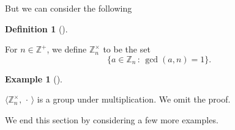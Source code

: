 \documentclass[10pt,]{book}
\theoremstyle{plain}
\theoremstyle{definition}
\newtheorem{definition}[theorem]{Definition}
\theoremstyle{definition}
\theoremstyle{definition}
\newtheorem{example}[theorem]{Example}
\theoremstyle{definition}
\numberwithin{equation}{section}
\def\Z{\mathbb{Z}}
\begin{document}
    But we can consider the following
\begin{definition}[{}]\label{definition-27}

        For \(n\in \Z^+\),
        we define \(\Z_n^{\times}\) to be the set %
\begin{equation*}
\{a\in \Z_n\,:\,\gcd(a,n)=1\}\text{.}
\end{equation*}
%
\label{notation-44}
\end{definition}
\begin{example}[]\label{example-20}

        \(\langle \Z_n^{\times},\,\cdot\, \rangle\) is a group under multiplication. We omit the proof.
\end{example}
\par

    We end this section by considering a few more examples.
\end{document}
